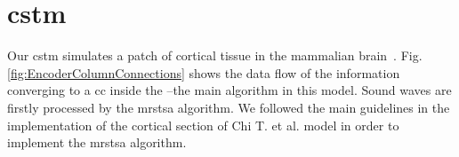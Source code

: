 \documentclass[11pt,a4paper]{article}
\begin{document}
\section{\gls{cstm}}


Our \gls{cstm} simulates a patch of cortical tissue in the mammalian brain~\cite{Dematties2018}. Fig. \ref{fig:EncoderColumnConnections} shows the data flow of the information converging to a \gls{cc} inside the --the main algorithm in this model. Sound waves are firstly processed by the \gls{mrstsa} algorithm. We followed the main guidelines in the implementation of the cortical section of Chi T. et al. \cite{chi_2005} model in order to implement the \gls{mrstsa} algorithm.
\end{document}
